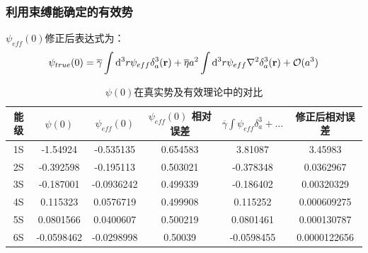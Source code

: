 \documentclass[hyperref,cs4size,titlepage,twoside]{ctexart}
\begin{document}
\subsubsection{利用束缚能确定的有效势}
$\psi_{eff}(0)$修正后表达式为：
\begin{equation}\label{psi0}
  \psi_{true}(0)=\overline{\gamma}\int\dd^3r\psi_{eff}\delta^3_a(\vb{r})+\overline{\eta}a^2\int\dd^3r\psi_{eff}\laplacian{\delta^3_a(\vb{r})}+\mathcal{O}(a^3)
\end{equation}
\begin{table}[!hbtp]
  \centering
  \begin{tabular}{|cccccc|}
    \hline
    能级 & $\psi(0)$ & $\psi_{eff}(0)$ & $\psi_{eff}(0)$ 相对误差& $\overline{\gamma}\int\psi_{eff}\delta^3_a+\dots$ & 修正后相对误差 \\
    \hline
    1S & -1.54924 & -0.535135 &0.654583& 3.81087&3.45983 \\
    2S & -0.392598 & -0.195113 &0.503021& -0.378348&0.0362967 \\
    3S & -0.187001 & -0.0936242 &0.499339& -0.186402&0.00320329 \\
    4S & 0.115323 & 0.0576719 &0.499908& 0.115252&0.000609275 \\
    5S & 0.0801566 & 0.0400607 &0.500219& 0.0801461&0.000130787 \\
    6S & -0.0598462 & -0.0298998 &0.50039& -0.0598455&0.0000122656 \\
    \hline
  \end{tabular}
  \caption{$\psi(0)$在真实势及有效理论中的对比}
\end{table}
\end{document}
